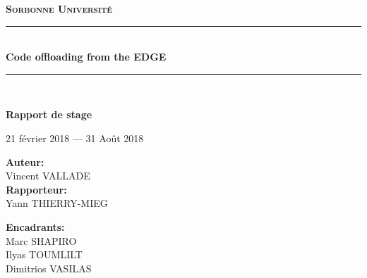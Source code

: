 \documentclass[11pt]{article}
\begin{document}
\newcommand{\HRule}{\rule{\linewidth}{0.5mm}}
\begin{center}	  
	\textsc{\LARGE \textbf{Sorbonne Université}}\\[2cm]
\end{center}

\begin{center}
	\HRule \\[0.4cm]
  	{ \huge \bfseries Code offloading from the EDGE\\[0.4cm] }
	\HRule \\[2cm]
\end{center}
\begin{center}
    \textbf{\LARGE Rapport de stage}\\
\end{center}
\par
\vspace{2\baselineskip}

\begin{center}
    {\large 21 février 2018 — 31 Août 2018}
\end{center}
\par
\vspace{4\baselineskip}
\par
\hfill

\begin{minipage}[b]{0.65\textwidth}
	\begin{flushleft}
		\LARGE \textbf{Auteur:}\\
		\LARGE Vincent VALLADE\\
		\LARGE \textbf{Rapporteur:}\\
		\LARGE Yann THIERRY-MIEG
	\end{flushleft}
	\end{minipage}%
	\begin{minipage}[b]{0.35\textwidth}
		\LARGE \textbf{Encadrants:}\\
		\LARGE Marc SHAPIRO\\
		\LARGE Ilyas TOUMLILT\\
		\LARGE Dimitrios VASILAS
	\end{minipage}
\vspace{2\baselineskip}

\par
{}
\hfill
{}
\thispagestyle{empty}
\clearpage
\end{document}
